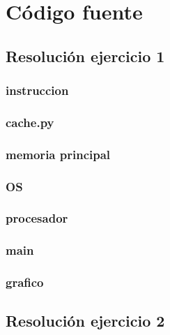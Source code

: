 \documentclass[11pt,a4paper]{article}
\begin{document}
\newpage
\appendix
\section{Código fuente}\label{appendix_codigo_fuente}

	\subsection{Resolución ejercicio 1}\label{ejercicio_1}
		\subsubsection{instruccion}
			
		\subsubsection{cache.py}
			
		\subsubsection{memoria principal}
			
		\subsubsection{OS}
			
		\subsubsection{procesador}
			
		\subsubsection{main}
			
		\subsubsection{grafico}
			

	\newpage

	\subsection{Resolución ejercicio 2}\label{ejercicio_2}
\end{document}
